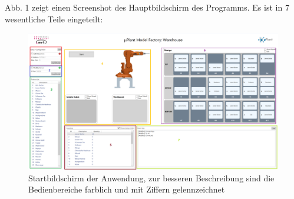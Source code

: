 \documentclass[11pt]{scrartcl}
\begin{document}
        Abb. 1 zeigt einen Screenshot des Hauptbildschirm des Programms. Es ist in 7 wesentliche Teile eingeteilt:
    \begin{figure}[h]
        \label{fig:figure}
        \includegraphics[width = \textwidth ]{study/Startbildschirm.png}
        \caption[Ansicht des Startbildschirms]%
        {\small Startbildschirm der Anwendung, zur besseren Beschreibung sind die Bedienbereiche farblich und mit Ziffern gelennzeichnet}
        \centering
    \end{figure}
\end{document}

